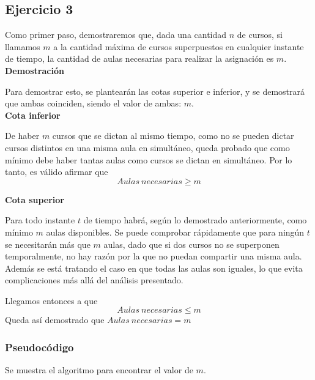 \documentclass{article}
\begin{document}
\subsection{Ejercicio 3}
Como primer paso, demostraremos que, dada una cantidad $n$ de cursos, si llamamos $m$ a la cantidad máxima de cursos superpuestos en cualquier instante de tiempo, la cantidad de aulas necesarias para realizar la asignación es $m$.\\

\textbf{Demostración}\par
Para demostrar esto, se plantearán las cotas superior e inferior, y se demostrará que ambas coinciden, siendo el valor de ambas: $m$.\\

\textbf{Cota inferior}\par
De haber $m$ cursos que se dictan al mismo tiempo, como no se pueden dictar cursos distintos en una misma aula en simultáneo, queda probado que como mínimo debe haber tantas aulas como cursos se dictan en simultáneo. Por lo tanto, es válido afirmar que $$Aulas\ necesarias \geq m$$\par
\textbf{Cota superior}\par
Para todo instante $t$ de tiempo habrá, según lo demostrado anteriormente, como mínimo $m$ aulas disponibles. Se puede comprobar rápidamente que para ningún $t$ se necesitarán más que $m$ aulas, dado que si dos cursos no se superponen temporalmente, no hay razón por la que no puedan compartir una misma aula. Además se está tratando el caso en que todas las aulas son iguales, lo que evita complicaciones más allá del análisis presentado.

Llegamos entonces a que $$Aulas\ necesarias \leq m$$
Queda así demostrado que $Aulas\ necesarias = m$
\subsubsection{Pseudocódigo}
Se muestra el algoritmo para encontrar el valor de $m$.\\
\end{document}
